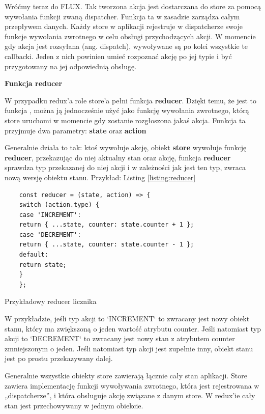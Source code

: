 Wróćmy teraz do FLUX. Tak tworzona akcja jest dostarczana do store za pomocą wywołania funkcji zwaną dispatcher. Funkcja ta w zasadzie zarządza całym przepływem danych. Każdy store w aplikacji rejestruje w dispatcherze swoje funkcje wywołania zwrotnego w celu obsługi przychodzących akcji. W momencie gdy akcja jest rozsyłana (ang. dispatch), wywoływane są po kolei wszystkie te callbacki. Jeden z nich powinien umieć rozpoznać akcję po jej typie i być przygotowany na jej odpowiednią obsługę.

\begin{center}
	\textbf{Funkcja reducer}
\end{center}

W przypadku redux'a role store'a pełni funkcja \textbf{reducer}. Dzięki temu, że jest to funkcja , można ją jednocześnie użyć jako funkcję wywołania zwrotnego, którą store uruchomi w momencie gdy zostanie rozgłoszona jakaś akcja. Funkcja ta przyjmuje dwa parametry: \textbf{state} oraz \textbf{action}

Generalnie działa to tak: ktoś wywołuje akcję, obiekt \textbf{store} wywołuje funkcję \textbf{reducer}, przekazując do niej aktualny stan oraz akcję, funkcja \textbf{reducer} sprawdza typ przekazanej do niej akcji i w zależności jak jest ten typ, zwraca nową wersję obiektu stanu. Przykład: Listing \ref{listing:reducer} 

\begin{listing}
	\begin{verbatim}
	const reducer = (state, action) => {
	switch (action.type) {
	case 'INCREMENT':
	return { ...state, counter: state.counter + 1 };
	case 'DECREMENT':
	return { ...state, counter: state.counter - 1 };
	default:
	return state;
	}
	};
	\end{verbatim}
	\caption{Przykładowy reducer licznika} \label{listing:reducer}
\end{listing}

W przykładzie, jeśli typ akcji to `INCREMENT` to zwracany jest nowy obiekt stanu, który ma zwiększoną o jeden wartość atrybutu counter. Jeśli natomiast typ akcji to `DECREMENT` to zwracany jest nowy stan z atrybutem counter zmniejszonym o jeden. Jeśli natomiast typ akcji jest zupełnie inny, obiekt stanu jest po prostu przekazywany dalej.

Generalnie wszystkie obiekty store zawierają łącznie cały stan aplikacji. Store zawiera implementację funkcji wywoływania zwrotnego, która jest rejestrowana w „dispatcherze”, i która obsługuje akcję związane z danym store.
W redux'ie cały stan jest przechowywany w jednym obiekcie.

